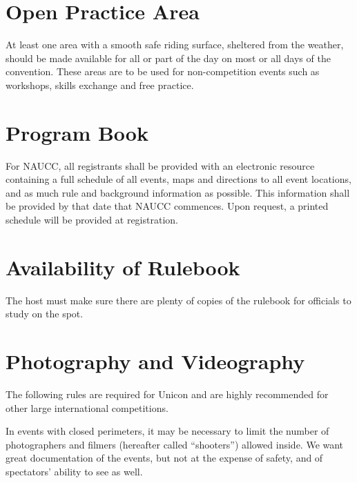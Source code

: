 \section{Open Practice Area}
At least one area with a smooth safe riding surface, sheltered from the weather, should be made available for all or part of the day on most or all days of the convention.
These areas are to be used for non-competition events such as workshops, skills exchange and free practice.

\section{Program Book}

For NAUCC, all registrants shall be provided with an electronic resource containing a full schedule of all events, maps and directions to all event locations, and as much rule and background information as possible.
This information shall be provided by that date that NAUCC commences.
Upon request, a printed schedule will be provided at registration.

\section{Availability of Rulebook}
The host must make sure there are plenty of copies of the rulebook for officials to study on the spot.

\section{Photography and Videography}
The following rules are required for Unicon and are highly recommended for other large international competitions.

In events with closed perimeters, it may be necessary to limit the number of photographers and filmers (hereafter called ``shooters'') allowed inside.
We want great documentation of the events, but not at the expense of safety, and of spectators' ability to see as well.


